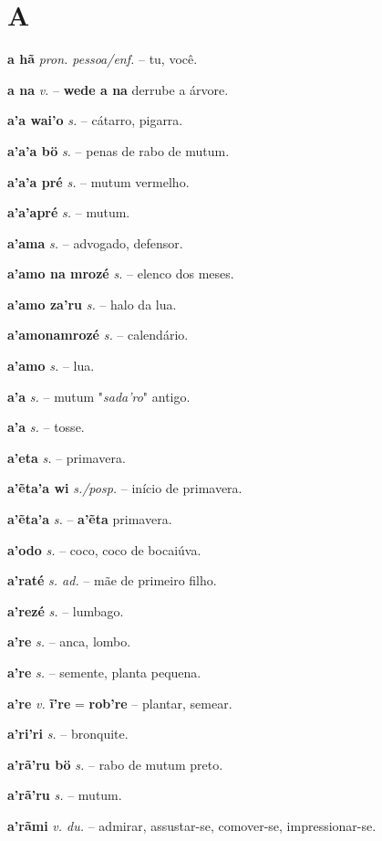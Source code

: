 \section*{A}


\textbf{a hã} \textit{pron. pessoa/enf.} -- tu, você.

\textbf{a na} \textit{v.} -- \textbf{wede a na} derrube a árvore.

\textbf{a'a wai'o} \textit{s.} -- cátarro, pigarra.

\textbf{a'a'a bö} \textit{s.} -- penas de rabo de mutum.

\textbf{a'a'a pré} \textit{s.} -- mutum vermelho.

\textbf{a'a'apré} \textit{s.} -- mutum.

\textbf{a'ama} \textit{s.} -- advogado, defensor.

\textbf{a'amo na mrozé} \textit{s.} -- elenco dos meses.

\textbf{a'amo za'ru} \textit{s.} -- halo da lua.

\textbf{a'amonamrozé} \textit{s.} -- calendário.

\textbf{a'amo} \textit{s.} -- lua.

\textbf{a'a} \textit{s.} -- mutum  "\textit{sada'ro}" antigo.

\textbf{a'a} \textit{s.} -- tosse.

\textbf{a'eta} \textit{s.} -- primavera.

\textbf{a'ẽta'a wi} \textit{s./posp.} -- início de primavera.

\textbf{a'ẽta'a} \textit{s.} -- \textbf{a'ẽta} primavera.

\textbf{a'odo} \textit{s.} -- coco, coco de bocaiúva.

\textbf{a'raté} \textit{s. ad.} -- mãe de primeiro filho.

\textbf{a'rezé} \textit{s.} -- lumbago.

\textbf{a're} \textit{s.} -- anca, lombo.

\textbf{a're} \textit{s.} -- semente, planta pequena.

\textbf{a're} \textit{v.} \textbf{ĩ're} = \textbf{rob're} -- plantar, semear.

\textbf{a'ri'ri} \textit{s.} -- bronquite.

\textbf{a'rã'ru bö} \textit{s.} -- rabo de mutum preto.

\textbf{a'rã'ru} \textit{s.} -- mutum.

\textbf{a'rãmi} \textit{v. du.} -- admirar, assustar-se, comover-se, impressionar-se.

